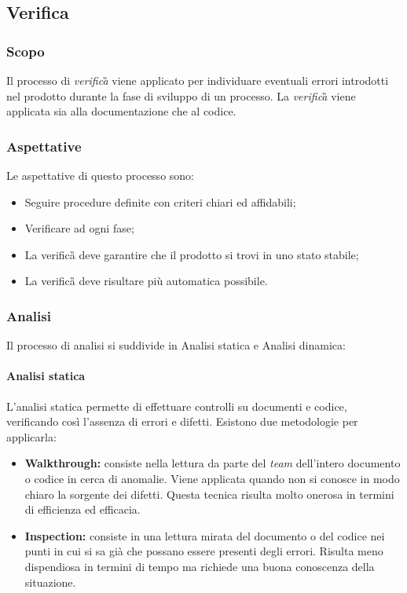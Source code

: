 	
		\subsection{Verifica}
			\subsubsection{Scopo}
				Il processo di \emph{verifica}\G{} viene applicato per individuare eventuali errori introdotti nel prodotto durante la fase di sviluppo di un processo. La \emph{verifica}\G{} viene applicata sia alla documentazione che al codice. %
			\subsubsection{Aspettative}
				Le aspettative di questo processo sono:
					\begin{itemize}
						\item Seguire procedure definite con criteri chiari ed affidabili;
						\item Verificare ad ogni fase;
						\item La verifica\G{} deve garantire che il prodotto si trovi in uno stato stabile;
						\item La verifica\G{} deve risultare più automatica possibile.
					\end{itemize}
				
				\subsubsection{Analisi}
					Il processo di analisi si suddivide in Analisi statica e Analisi dinamica:
						\paragraph*{Analisi statica}
						\aCapo{}  
							L'analisi statica permette di effettuare controlli su documenti e codice, verificando così l'assenza di errori e difetti. Esistono due metodologie per applicarla:
								\begin{itemize}
									\item \textbf{Walkthrough:} consiste nella lettura da parte del \emph{team} dell'intero documento o codice in cerca di anomalie. Viene applicata quando non si conosce in modo chiaro la sorgente dei difetti. Questa tecnica risulta molto onerosa in termini di efficienza ed efficacia.
									\item \textbf{Inspection:} consiste in una lettura mirata del documento o del codice nei punti in cui si sa già che possano essere presenti degli errori. Risulta meno dispendiosa in termini di tempo ma richiede una buona conoscenza della situazione.
								\end{itemize}
